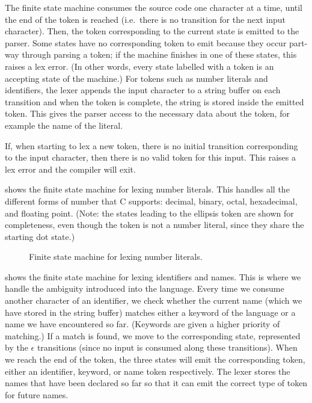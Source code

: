\documentclass[00-main.tex]{subfiles}
\begin{document}
The finite state machine consumes the source code one character at a time, until the end of the token is reached (i.e.\ there is no transition for the next input character).
Then, the token corresponding to the current state is emitted to the parser.
Some states have no corresponding token to emit because they occur part-way through parsing a token; if the machine finishes in one of these states, this raises a lex error.
(In other words, every state labelled with a token is an accepting state of the machine.)
For tokens such as number literals and identifiers, the lexer appends the input character to a string buffer on each transition and when the token is complete, the string is stored inside the emitted token.
This gives the parser access to the necessary data about the token, for example the name of the literal.

If, when starting to lex a new token, there is no initial transition corresponding to the input character, then there is no valid token for this input. This raises a lex error and the compiler will exit.

 shows the finite state machine for lexing number literals. This handles all the different forms of number that C supports: decimal, binary, octal, hexadecimal, and floating point.
(Note: the states leading to the ellipsis token are shown for completeness, even though the token is not a number literal, since they share the starting dot state.)

\begin{figure}[!htb]
  \centering
  \caption{Finite state machine for lexing number literals.}
  \label{fig:lexing numbers fsm} %
\end{figure}

 shows the finite state machine for lexing identifiers and  names.
This is where we handle the ambiguity introduced into the language.
  Every time we consume another character of an identifier, we check whether the current name (which we have stored in the string buffer) matches either a keyword of the language or a  name we have encountered so far.
(Keywords are given a higher priority of matching.)
  If a match is found, we move to the corresponding state, represented by the $\epsilon$ transitions (since no input is consumed along these transitions).
When we reach the end of the token, the three states will emit the corresponding token, either an identifier, keyword, or  name token respectively.
The lexer stores the  names that have been declared so far so that it can emit the correct type of token for future names.
\end{document}
